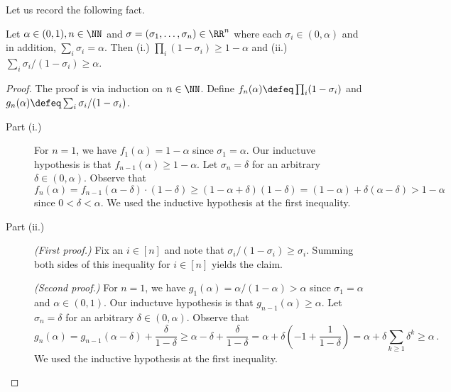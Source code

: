 

Let us record the following fact. 

\begin{fact}\label{fact:sigma}
    Let $\alpha \in (0, 1), n \in \NN$ and $\sigma = (\sigma_1, \ldots, \sigma_n) \in \RR^n$ 
    where each $\sigma_i \in (0, \alpha)$ and in addition, $\sum_i \sigma_i = \alpha$. 
    Then 
    (i.) $\prod_i (1 - \sigma_i) \geq 1 - \alpha$ and 
    (ii.) $\sum_i \sigma_i/(1 - \sigma_i) \geq \alpha$.
\end{fact}
\begin{proof}
    The proof is via induction on $n \in \NN$.
    Define $f_n(\alpha) \defeq \prod_i (1 - \sigma_i)$ and
    $g_n(\alpha) \defeq \sum_i \sigma_i/(1 - \sigma_i)$.

    \begin{description}
        \item[Part (i.)]
        For $n = 1$, we have $f_1(\alpha) = 1 - \alpha$ since $\sigma_1 = \alpha$. 
        Our inductuve hypothesis is that $f_{n-1}(\alpha) \geq 1 - \alpha$.
        Let $\sigma_n = \delta$ for 
        an arbitrary $\delta \in (0, \alpha)$. 
        Observe that 
        \[
        f_n(\alpha) 
        = f_{n-1}(\alpha - \delta) \cdot (1-\delta)
        \geq (1 - \alpha + \delta)(1 - \delta)
        = (1 - \alpha) + \delta(\alpha - \delta)
        > 1 - \alpha
        \]
        since $0 < \delta < \alpha$. 
        We used the inductive hypothesis at the first inequality.

        \item[Part (ii.)]
        \emph{(First proof.)}
        Fix an $i \in [n]$ and note that $\sigma_i/(1 - \sigma_i) \geq \sigma_i$. 
        Summing both sides of this inequality 
        for $i \in [n]$ yields the claim.

        \emph{(Second proof.)}
        For $n = 1$, we have $g_1(\alpha) = \alpha/(1 - \alpha) > \alpha$ since 
        $\sigma_1 = \alpha$ and $\alpha \in (0, 1)$. 
        Our inductuve hypothesis is that $g_{n-1}(\alpha) \geq \alpha$.
        Let $\sigma_n = \delta$ for 
        an arbitrary $\delta \in (0, \alpha)$. 
        Observe that 
        \[
        g_n(\alpha) 
        = g_{n-1}(\alpha - \delta) + \frac{\delta}{1-\delta}
        \geq \alpha - \delta +\frac{\delta}{1-\delta}
        = \alpha + \delta \left(-1 + \frac{1}{1 - \delta}\right)
        = \alpha + \delta \sum_{k \geq 1} \delta^k
        \geq \alpha
        \,.
        \]
        We used the inductive hypothesis at the first inequality.
    \end{description}
\end{proof}




